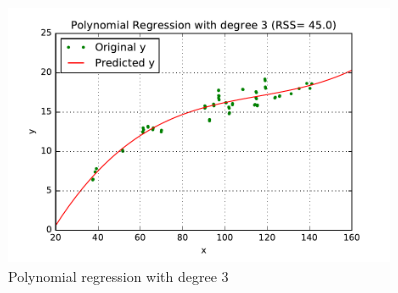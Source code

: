 \begin{description}
 
\begin{figure}[H]
\centering
\includegraphics[width=0.9\textwidth]{./figures/poly_3.pdf}
\caption{\label{fig:poly_3} Polynomial regression with degree 3}
\end{figure}
 
\end{description}


